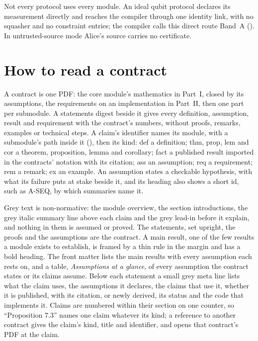 Not every protocol uses every module. An ideal qubit protocol declares its
measurement directly and reaches the compiler through one identity link, with
no squasher and no constraint entries; the compiler calls this direct route
Band~A (). In untrusted-source mode Alice's
source carries no certificate.

\section*{How to read a contract}

A contract is one PDF: the core module's mathematics in Part~I, closed by its
assumptions, the requirements on an implementation in Part~II, then one part
per submodule. A statements digest beside it gives every definition,
assumption, result and requirement with the contract's numbers, without
proofs, remarks, examples or technical steps. A claim's identifier names its
module, with a submodule's path inside it
(), then its kind:
\textsf{def} a definition; \textsf{thm}, \textsf{prop}, \textsf{lem} and
\textsf{cor} a theorem, proposition, lemma and corollary; \textsf{fact} a
published result imported in the contracts' notation with its citation;
\textsf{ass} an assumption; \textsf{req} a requirement; \textsf{rem} a remark;
\textsf{ex} an example. An assumption states a checkable hypothesis, with
what its failure puts at stake beside it, and its heading also shows a short
id, such as A-SEQ, by which summaries name it.

Grey text is non-normative: the module overview, the section introductions,
the grey italic summary line above each claim and the grey lead-in before it
explain, and nothing in them is assumed or proved. The statements, set
upright, the proofs and the assumptions are the contract. A main result, one
of the few results a module exists to establish, is framed by a thin rule in
the margin and has a bold heading. The front matter lists the main results
with every assumption each rests on, and a table, \emph{Assumptions at a
glance}, of every assumption the contract states or its claims assume. Below
each statement a small grey meta line lists what the claim uses, the
assumptions it declares, the claims that use it, whether it is published,
with its citation, or newly derived, its status and the code that implements
it. Claims are numbered within their section on one counter, so
``Proposition 7.3'' names one claim whatever its kind; a reference to another
contract gives the claim's kind, title and identifier, and opens that
contract's PDF at the claim.

